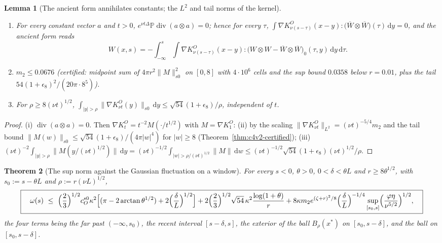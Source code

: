 \documentclass[11pt]{article}
\newcommand{\dd}{\,\mathrm d}
\newcommand{\PP}{\mathbb P}
\theoremstyle{plain}
\newtheorem{theorem}{Theorem}[section]
\newtheorem{lemma}[theorem]{Lemma}
\theoremstyle{definition}
\theoremstyle{remark}
\begin{document}
\begin{lemma}[The ancient form annihilates constants; the \(L^2\) and tail norms of the kernel]
\label{lem:c4v22-constants}
\begin{enumerate}[label=\textup{(\roman*)},leftmargin=3.2em]
\item For every constant vector \(a\) and \(t>0\), \(e^{\nu t\Delta}\PP\operatorname{div}(a\otimes a)=0\); hence for
      every \(\tau\), \(\int\nabla K^O_{\nu(s-\tau)}(x-y):\bigl(\overline W\otimes\overline W\bigr)(\tau)\dd y=0\), and the ancient form
      reads
      \begin{equation}
       W(x,s)=-\int_{-\infty}^s\!\!\int\nabla K^O_{\nu(s-\tau)}(x-y):\bigl(W\otimes W-\overline W\otimes\overline W\bigr)_0(\tau,y)\dd y\dd\tau .
       \label{eq:c4v22-ancient}
      \end{equation}
\item \(m_2\le0.0676\) (certified: midpoint sum of \(4\pi r^2\|M\|_{s0}^2\) on \([0,8]\) with
      \(4\cdot10^6\) cells and the sup bound \(0.0358\) below \(r=0.01\), plus the tail
      \(54(1+\epsilon_8)^2/(20\pi\cdot8^5)\)).
\item For \(\rho\ge8(\nu t)^{1/2}\), \(\int_{|y|>\rho}\|\nabla K^O_{\nu t}(y)\|_{s0}\dd y\le\sqrt{54}(1+\epsilon_8)/\rho\), independent
      of \(t\).
\end{enumerate}
\end{lemma}

\begin{proof}
(i) \(\operatorname{div}(a\otimes a)=0\).  Then \(\nabla K^O_t=t^{-2}M(\cdot/t^{1/2})\) with \(M=\nabla K^O_1\): (ii) by the
scaling \(\|\nabla K^O_{\nu t}\|_{L^2}=(\nu t)^{-5/4}m_2\) and the tail bound \(\|M(w)\|_{s0}\le\sqrt{54}(1+\epsilon_8)/(4\pi|w|^4)\)
for \(|w|\ge8\) (Theorem~\ref{thm:c4v2-certified}); (iii)
\((\nu t)^{-2}\int_{|y|>\rho}\|M(y/(\nu t)^{1/2})\|\dd y=(\nu t)^{-1/2}\int_{|w|>\rho/(\nu t)^{1/2}}\|M\|\dd w\le(\nu t)^{-1/2}\sqrt{54}(1+\epsilon_8)(\nu t)^{1/2}/\rho\).
\end{proof}

\begin{theorem}[The sup norm against the Gaussian fluctuation on a window]
\label{thm:c4v22-window}
For every \(s<0\), \(\theta>0\), \(0<\delta<\theta L\) and \(r\ge8\theta^{1/2}\), with \(s_0:=s-\theta L\) and
\(\rho:=r(\nu L)^{1/2}\),
\begin{equation}
 \boxed{\quad
 \omega(s)\ \le\ \Bigl(\frac23\Bigr)^{1/2}c_O^{s0}\kappa^2\Bigl[(\pi-2\arctan\theta^{1/2})+2\Bigl(\frac\delta L\Bigr)^{1/2}\Bigr]
 +2\Bigl(\frac23\Bigr)^{1/2}\sqrt{54}\,\kappa^2\frac{\log(1+\theta)}r
 +8\kappa m_2e^{(\zeta+r)^2/8}\Bigl(\frac\delta L\Bigr)^{-1/4}\sup_{[s_0,s]}\Bigl(\frac{\varphi\eta}{\nu^{5/2}}\Bigr)^{1/2} ,
 \quad}
 \label{eq:c4v22-window}
\end{equation}
the four terms being the far past \((-\infty,s_0)\), the recent interval
\([s-\delta,s]\), the exterior of the ball \(B_\rho(x^*)\) on \([s_0,s-\delta]\), and the ball
on \([s_0,s-\delta]\).
\end{theorem}
\end{document}
